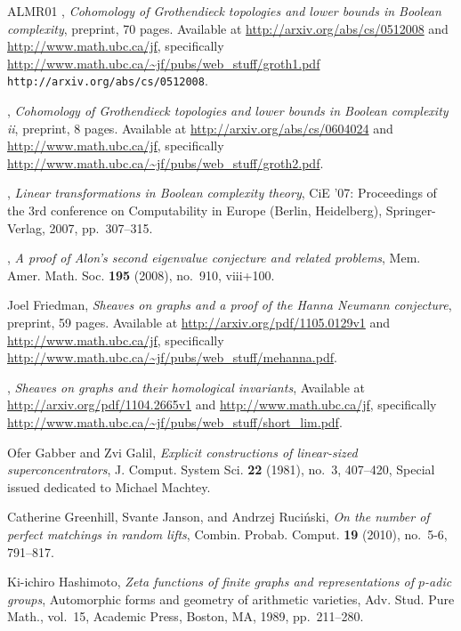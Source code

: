 \documentclass{memo-l}
\theoremstyle{plain}
\theoremstyle{definition}
\numberwithin{section}{chapter}
\numberwithin{equation}{chapter}
\theoremstyle{plain}
\theoremstyle{definition}
\begin{document}
\begin{thebibliography}{ALMR01}
\bysame, \emph{Cohomology of {G}rothendieck topologies and lower bounds in
  {B}oolean complexity}, preprint, 70 pages. Available at
  \url{http://arxiv.org/abs/cs/0512008} and \url{http://www.math.ubc.ca/jf},
  specifically \url{http://www.math.ubc.ca/~jf/pubs/web_stuff/groth1.pdf} {\tt
  http://arxiv.org/abs/cs/0512008}.

\bysame, \emph{Cohomology of {G}rothendieck topologies and lower bounds in
  {B}oolean complexity ii}, preprint, 8 pages. Available at
  \url{http://arxiv.org/abs/cs/0604024} and \url{http://www.math.ubc.ca/jf},
  specifically \url{http://www.math.ubc.ca/~jf/pubs/web_stuff/groth2.pdf}.

\bysame, \emph{Linear transformations in {B}oolean complexity theory}, CiE '07:
  Proceedings of the 3rd conference on Computability in Europe (Berlin,
  Heidelberg), Springer-Verlag, 2007, pp.~307--315.

\bysame, \emph{A proof of {A}lon's second eigenvalue conjecture and related
  problems}, Mem. Amer. Math. Soc. \textbf{195} (2008), no.~910, viii+100.

Joel Friedman, \emph{Sheaves on graphs and a proof of the {H}anna {N}eumann
  conjecture}, preprint, 59 pages. Available at
  \url{http://arxiv.org/pdf/1105.0129v1} and \url{http://www.math.ubc.ca/jf},
  specifically \url{http://www.math.ubc.ca/~jf/pubs/web_stuff/mehanna.pdf}.

\bysame, \emph{Sheaves on graphs and their homological invariants}, Available
  at \url{http://arxiv.org/pdf/1104.2665v1} and
  \url{http://www.math.ubc.ca/jf}, specifically
  \url{http://www.math.ubc.ca/~jf/pubs/web_stuff/short_lim.pdf}.

Ofer Gabber and Zvi Galil, \emph{Explicit constructions of linear-sized
  superconcentrators}, J. Comput. System Sci. \textbf{22} (1981), no.~3,
  407--420, Special issued dedicated to Michael Machtey. 

Catherine Greenhill, Svante Janson, and Andrzej Ruci{\'n}ski, \emph{On the
  number of perfect matchings in random lifts}, Combin. Probab. Comput.
  \textbf{19} (2010), no.~5-6, 791--817. 

Ki-ichiro Hashimoto, \emph{Zeta functions of finite graphs and representations
  of {$p$}-adic groups}, Automorphic forms and geometry of arithmetic
  varieties, Adv. Stud. Pure Math., vol.~15, Academic Press, Boston, MA, 1989,
  pp.~211--280. 


\end{thebibliography}
\end{document}
